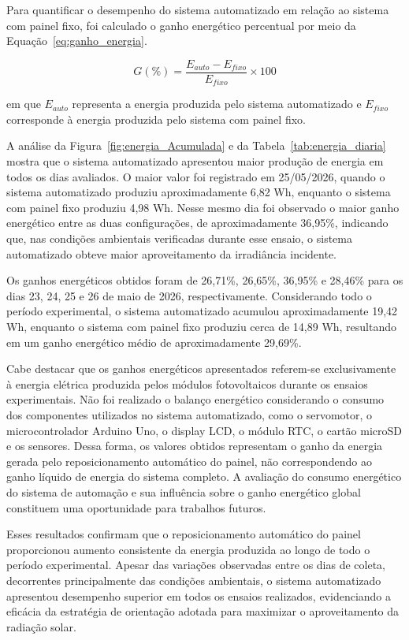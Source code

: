 Para quantificar o desempenho do sistema automatizado em relação ao sistema com painel fixo, foi calculado o ganho energético percentual por meio da Equação~\ref{eq:ganho_energia}.

\begin{equation}
G(\%)=
\frac{E_{auto}-E_{fixo}}
{E_{fixo}}
\times100
\label{eq:ganho_energia}
\end{equation}

em que $E_{auto}$ representa a energia produzida pelo sistema automatizado e $E_{fixo}$ corresponde à energia produzida pelo sistema com painel fixo.

A análise da Figura~\ref{fig:energia_Acumulada} e da Tabela~\ref{tab:energia_diaria} mostra que o sistema automatizado apresentou maior produção de energia em todos os dias avaliados. O maior valor foi registrado em 25/05/2026, quando o sistema automatizado produziu aproximadamente 6,82 Wh, enquanto o sistema com painel fixo produziu 4,98 Wh. Nesse mesmo dia foi observado o maior ganho energético entre as duas configurações, de aproximadamente 36,95\%, indicando que, nas condições ambientais verificadas durante esse ensaio, o sistema automatizado obteve maior aproveitamento da irradiância incidente.

Os ganhos energéticos obtidos foram de 26,71\%, 26,65\%, 36,95\% e 28,46\% para os dias 23, 24, 25 e 26 de maio de 2026, respectivamente. Considerando todo o período experimental, o sistema automatizado acumulou aproximadamente 19,42 Wh, enquanto o sistema com painel fixo produziu cerca de 14,89 Wh, resultando em um ganho energético médio de aproximadamente 29,69\%.

Cabe destacar que os ganhos energéticos apresentados referem-se exclusivamente à energia elétrica produzida pelos módulos fotovoltaicos durante os ensaios experimentais. Não foi realizado o balanço energético considerando o consumo dos componentes utilizados no sistema automatizado, como o servomotor, o microcontrolador Arduino Uno, o display LCD, o módulo RTC, o cartão microSD e os sensores. Dessa forma, os valores obtidos representam o ganho da energia gerada pelo reposicionamento automático do painel, não correspondendo ao ganho líquido de energia do sistema completo. A avaliação do consumo energético do sistema de automação e sua influência sobre o ganho energético global constituem uma oportunidade para trabalhos futuros.

Esses resultados confirmam que o reposicionamento automático do painel proporcionou aumento consistente da energia produzida ao longo de todo o período experimental. Apesar das variações observadas entre os dias de coleta, decorrentes principalmente das condições ambientais, o sistema automatizado apresentou desempenho superior em todos os ensaios realizados, evidenciando a eficácia da estratégia de orientação adotada para maximizar o aproveitamento da radiação solar.